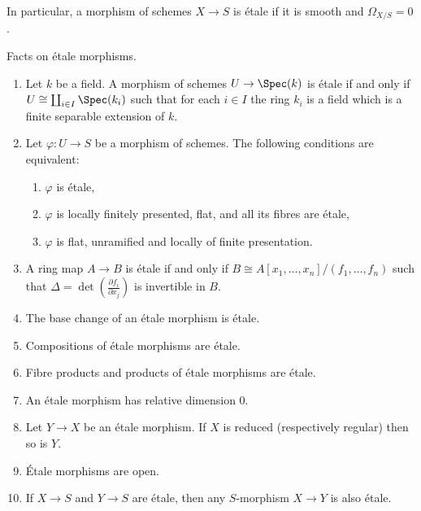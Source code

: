\noindent
In particular, a morphism of schemes $X \to S$ is \'etale if it is smooth
and $\Omega_{X/S} = 0$.

\begin{proposition}
\label{proposition-etale-morphisms}
Facts on \'etale morphisms.
\begin{enumerate}
\item Let $k$ be a field. A morphism of schemes $U \to \Spec(k)$ is
\'etale if and only if $U \cong \coprod_{i \in I} \Spec(k_i)$
such that for each $i \in I$
the ring $k_i$ is a field which is a finite separable extension of $k$.
\item Let $\varphi : U \to S$ be a morphism of schemes. The following
conditions are equivalent:
\begin{enumerate}
\item $\varphi$ is \'etale,
\item $\varphi$ is locally finitely presented, flat, and all its fibres are
\'etale,
\item $\varphi$ is flat, unramified and locally of finite presentation.
\end{enumerate}
\item A ring map $A \to B$ is \'etale if and only if
$B \cong A[x_1, \ldots, x_n]/(f_1, \ldots, f_n)$
such that $\Delta = \det \left( \frac{\partial f_i}{\partial x_j} \right)$
is invertible in $B$.
\item The base change of an \'etale morphism is \'etale.
\item Compositions of \'etale morphisms are \'etale.
\item Fibre products and products of \'etale morphisms are \'etale.
\item An \'etale morphism has relative dimension 0.
\item Let $Y \to X$ be an \'etale morphism.
If $X$ is reduced (respectively regular) then so is $Y$.
\item \'Etale morphisms are open.
\item If $X \to S$ and $Y \to S$ are \'etale, then any
$S$-morphism $X \to Y$ is also \'etale.
\end{enumerate}
\end{proposition}

